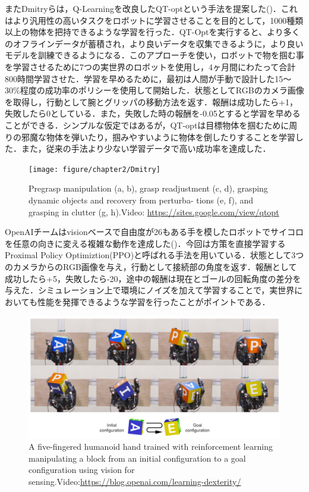 またDmitryらは，Q-Learningを改良したQT-optという手法を提案した\cite{Dmitry2018}()．これはより汎用性の高いタスクをロボットに学習させることを目的として，1000種類以上の物体を把持できるような学習を行った．QT-Optを実行すると、より多くのオフラインデータが蓄積され，より良いデータを収集できるように，より良いモデルを訓練できるようになる．このアプローチを使い，ロボットで物を掴む事を学習させるために7つの実世界のロボットを使用し，4ヶ月間にわたって合計800時間学習させた．学習を早めるために，最初は人間が手動で設計した15～30\%程度の成功率のポリシーを使用して開始した．状態としてRGBのカメラ画像を取得し，行動として腕とグリッパの移動方法を返す．報酬は成功したら+1，失敗したら0としている．また，失敗した時の報酬を-0.05とすると学習を早めることができる．シンプルな仮定ではあるが，QT-optは目標物体を掴むために周りの邪魔な物体を弾いたり，掴みやすいように物体を倒したりすることを学習した．また，従来の手法より少ない学習データで高い成功率を達成した．

\begin{figure}
    \centering
    \texttt{[image: figure/chapter2/Dmitry]}
    \caption{Pregrasp manipulation (a, b), grasp readjustment (c, d), grasping dynamic objects and recovery from perturba- tions (e, f), and grasping in clutter (g, h)\cite{Dmitry2018}.Video: \url{https://sites.google.com/view/qtopt}}
    \label{fig:Dmitry}
\end{figure}


OpenAIチームはvisionベースで自由度が26もある手を模したロボットでサイコロを任意の向きに変える複雑な動作を達成した\cite{OpenAI2018}()．今回は方策を直接学習するProximal Policy Optimiztion(PPO)と呼ばれる手法を用いている．状態として3つのカメラからのRGB画像を与え，行動として接続部の角度を返す．報酬として成功したら+5，失敗したら-20，途中の報酬は現在とゴールの回転角度の差分を与えた．シミュレーション上で環境にノイズを加えて学習することで，実世界においても性能を発揮できるような学習を行ったことがポイントである．
\begin{figure}
    \centering
    \includegraphics[width=\linewidth]{figure/chapter2/openAI_cube}
    \caption{A five-fingered humanoid hand trained with reinforcement learning manipulating a block from an initial configuration to a goal configuration using vision for sensing\cite{OpenAI2018}.Video:\url{https://blog.openai.com/learning-dexterity/}}
    \label{fig:OpenAI}
\end{figure}
